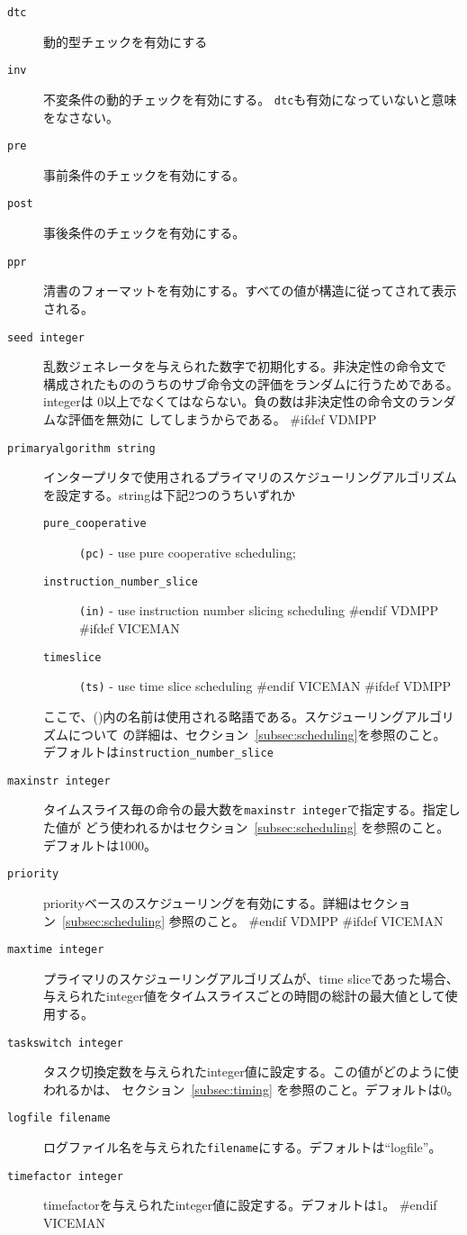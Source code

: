 \documentclass[\pformat,12pt]{article}
\begin{document}
\begin{description}
  \begin{description}
  \item[{\tt dtc}] 動的型チェックを有効にする
  \item[{\tt inv}] 不変条件の動的チェックを有効にする。 {\tt dtc}も有効になっていないと意味をなさない。
  \item[{\tt pre}] 事前条件のチェックを有効にする。
  \item[{\tt post}] 事後条件のチェックを有効にする。
  \item[{\tt ppr}] 清書のフォーマットを有効にする。すべての値が構造に従ってされて表示される。
  \item[{\tt seed integer}]
    乱数ジェネレータを与えられた数字で初期化する。非決定性の命令文で
    構成されたもののうちのサブ命令文の評価をランダムに行うためである。integerは
     0以上でなくてはならない。負の数は非決定性の命令文のランダムな評価を無効に
    してしまうからである。
#ifdef VDMPP
  \item[{\tt primaryalgorithm string}]
    インタープリタで使用されるプライマリのスケジューリングアルゴリズムを設定する。stringは下記2つのうちいずれか
    \begin{description}
    \item[{\tt pure\_cooperative}] \texttt{(pc)} - use pure
      cooperative scheduling;
    \item[{\tt instruction\_number\_slice}] \texttt{(in)} - use
      instruction number slicing scheduling
#endif VDMPP
#ifdef VICEMAN
    \item[{\tt timeslice}] \texttt{(ts)} - use time slice scheduling 
#endif VICEMAN
#ifdef VDMPP
    \end{description}
    ここで、()内の名前は使用される略語である。スケジューリングアルゴリズムについて
    の詳細は、セクション~\ref{subsec:scheduling}を参照のこと。
    デフォルトは{\tt instruction\_number\_slice}
  \item[{\tt maxinstr integer}]
    タイムスライス毎の命令の最大数を{\tt maxinstr integer}で指定する。指定した値が
    どう使われるかはセクション~\ref{subsec:scheduling} を参照のこと。デフォルトは1000。
  \item[{\tt priority}]
    priorityベースのスケジューリングを有効にする。詳細はセクション~\ref{subsec:scheduling} 参照のこと。
#endif VDMPP
#ifdef VICEMAN
  \item[{\tt maxtime integer}]
    プライマリのスケジューリングアルゴリズムが、time sliceであった場合、
    与えられたinteger値をタイムスライスごとの時間の総計の最大値として使用する。
  \item[{\tt taskswitch integer}]
    タスク切換定数を与えられたinteger値に設定する。この値がどのように使われるかは、
    セクション~\ref{subsec:timing} を参照のこと。デフォルトは0。
  \item[{\tt logfile filename}]
    ログファイル名を与えられた{\tt filename}にする。デフォルトは``logfile''。
  \item[{\tt timefactor integer}]
    timefactorを与えられたinteger値に設定する。デフォルトは1。
#endif VICEMAN
  \end{description}
  

\end{description}
\end{document}

